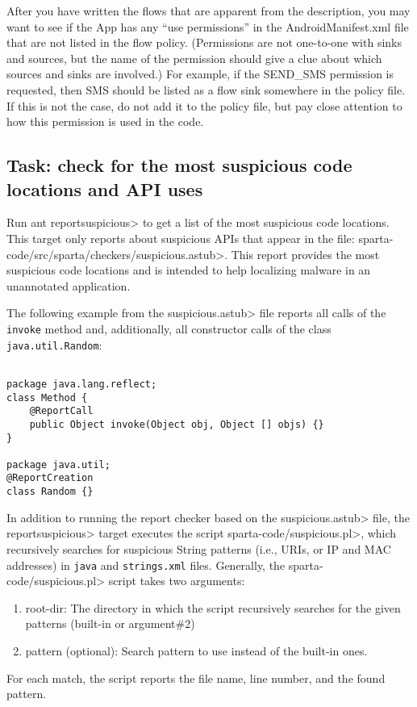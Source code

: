  After you have written the flows that are apparent from the description, you may want to see if the App
  has any ``use permissions'' in the AndroidManifest.xml file that are not listed in the flow policy. 
  (Permissions are not one-to-one with sinks and sources, but the name of the permission should give 
  a clue about which sources and sinks are involved.)  For example, if the SEND\_SMS permission is 
  requested, then SMS should be listed as a flow sink somewhere in the policy file.  If this is not the 
  case, do not add it to the policy file, but pay close attention to how this permission is used in the 
  code.

\subsection{Task: check for the most suspicious code locations and API uses}
\label{sec:appanalysis/suspicious}
Run \<ant reportsuspicious> to get a list of the most suspicious code
locations. 
This target only reports about suspicious APIs that appear 
in the file:
\<sparta-code/src/sparta/checkers/suspicious.astub>. This report
provides the most suspicious code locations and is intended to help
localizing malware in an unannotated application.

The following example from the \<suspicious.astub> file reports all calls
of the \verb|invoke| method and, additionally, all constructor calls 
of the class \verb|java.util.Random|:

\begin{Verbatim}

package java.lang.reflect;                                             
class Method {                                                         
    @ReportCall                                                        
    public Object invoke(Object obj, Object [] objs) {}                
}                                                                      
                                                                       
package java.util;                                                     
@ReportCreation                                                        
class Random {}

\end{Verbatim}

In addition to running the report checker based on the 
\<suspicious.astub> file, the \<reportsuspicious> target executes
the script \<sparta-code/suspicious.pl>, which recursively searches for 
suspicious String patterns (i.e., URIs, or IP and MAC addresses) 
in \verb|java| and \verb|strings.xml| files.
Generally, the \<sparta-code/suspicious.pl> script takes two arguments:
\begin{enumerate}
 \item root-dir: The directory in which the script recursively 
       searches for the given patterns (built-in or argument\#2)
 \item pattern (optional): Search pattern to use instead of the
built-in ones. 
\end{enumerate}
For each match, the script reports the file name, line
number, and the found pattern.

